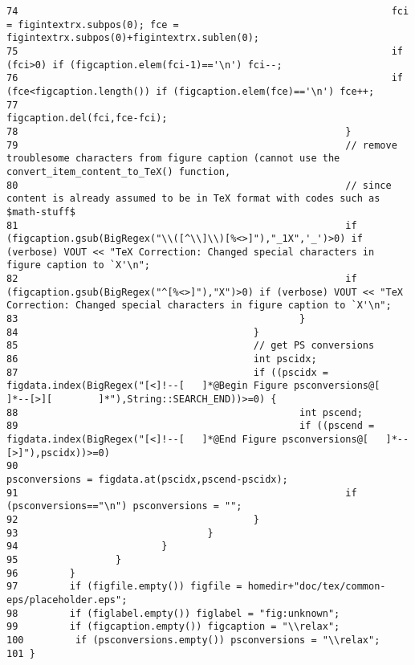 \begin{verbatim}
74                                                                 fci = figintextrx.subpos(0); fce = figintextrx.subpos(0)+figintextrx.sublen(0);
75                                                                 if (fci>0) if (figcaption.elem(fci-1)=='\n') fci--;
76                                                                 if (fce<figcaption.length()) if (figcaption.elem(fce)=='\n') fce++;
77                                                                 figcaption.del(fci,fce-fci);
78                                                         }
79                                                         // remove troublesome characters from figure caption (cannot use the convert_item_content_to_TeX() function,
80                                                         // since content is already assumed to be in TeX format with codes such as $math-stuff$
81                                                         if (figcaption.gsub(BigRegex("\\([^\\]\\)[%<>]"),"_1X",'_')>0) if (verbose) VOUT << "TeX Correction: Changed special characters in figure caption to `X'\n";
82                                                         if (figcaption.gsub(BigRegex("^[%<>]"),"X")>0) if (verbose) VOUT << "TeX Correction: Changed special characters in figure caption to `X'\n";
83                                                 }
84                                         }
85                                         // get PS conversions
86                                         int pscidx;
87                                         if ((pscidx = figdata.index(BigRegex("[<]!--[   ]*@Begin Figure psconversions@[         ]*--[>][        ]*"),String::SEARCH_END))>=0) {
88                                                 int pscend;
89                                                 if ((pscend = figdata.index(BigRegex("[<]!--[   ]*@End Figure psconversions@[   ]*--[>]"),pscidx))>=0)
90                                                         psconversions = figdata.at(pscidx,pscend-pscidx);
91                                                         if (psconversions=="\n") psconversions = "";
92                                         }
93                                 }
94                         }
95                 }
96         }
97         if (figfile.empty()) figfile = homedir+"doc/tex/common-eps/placeholder.eps";
98         if (figlabel.empty()) figlabel = "fig:unknown";
99         if (figcaption.empty()) figcaption = "\\relax";
100         if (psconversions.empty()) psconversions = "\\relax";
101 }
\end{verbatim}\normalsize 
{}
